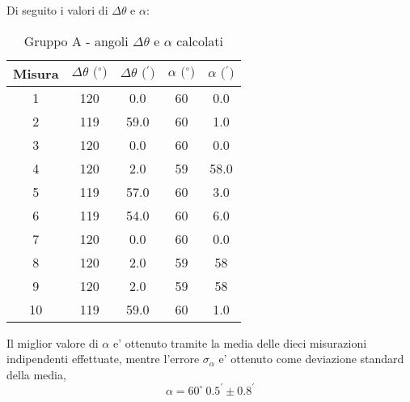 Di seguito i valori di $\Delta \theta$ e $\alpha$:
\begin{table}[!htbp]
    {\par\centering
    \begin{tabular}{ccccc}
        \hline
        Misura & $\Delta \theta \text{ ($^{\circ}$)}$ & $\Delta \theta \text{ ($^{\prime}$)}$ & $\alpha \text{ ($^{\circ}$)}$ & $\alpha \text{ ($^{\prime}$)}$\\
        \hline
        1   &   120 &   0.0     &   60  &   0.0\\
        2   &   119 &   59.0    &   60  &   1.0\\
        3   &   120 &   0.0     &   60  &   0.0\\
        4   &   120 &   2.0     &   59  &   58.0\\
        5   &   119 &   57.0    &   60  &   3.0\\
        6   &   119 &   54.0    &   60  &   6.0\\
        7   &   120 &   0.0     &   60  &   0.0\\
        8   &   120 &   2.0     &   59  &   58\\
        9   &   120 &   2.0     &   59  &   58\\
        10  &   119 &   59.0    &   60  &   1.0\\
        \hline
    \end{tabular}
    \par}
    \caption{Gruppo A - angoli $\Delta \theta$ e $\alpha$ calcolati}
\end{table}

Il miglior valore di $\alpha$ e' ottenuto tramite la media delle dieci misurazioni indipendenti effettuate, mentre l'errore $\sigma_{\alpha}$ e' ottenuto come deviazione standard della media,
\[
    \alpha = 60^{\circ} \ 0.5^{\prime} \pm 0.8^{\prime}
\]

